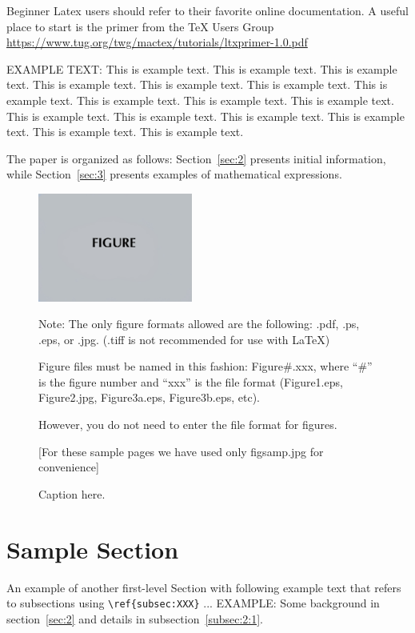 \documentclass[preprint]{JASA}
\begin{document}
  Beginner Latex users should refer to their favorite online
  documentation. A
  useful place to start is the primer from the TeX Users Group 
  \url{https://www.tug.org/twg/mactex/tutorials/ltxprimer-1.0.pdf}

EXAMPLE TEXT: This is example text. This is example text. This is
example text. This is example text. This is example text. This is
example text. This is example text. This is example text. This is
example text. This is example text. This is example text. This is
example text. This is example text. This is example text. This is
example text. This is example text. 

The paper is organized as follows: Section~\ref{sec:2} presents
initial information, while
Section~\ref{sec:3} presents examples of mathematical expressions.
\newpage


\begin{figure}[t]
\includegraphics[width=2in]{figsamp}
\caption{\label{fig:FIG1}{Caption here.}}

\raggedright
Note: The only figure formats allowed are the following: 
.pdf, .ps, .eps, or .jpg.  (.tiff is not recommended for use with LaTeX)

Figure files must be named in this fashion:
Figure\#.xxx, where ``\#'' is the figure number and ``xxx'' is the file format
(Figure1.eps, Figure2.jpg, Figure3a.eps, Figure3b.eps, etc). 

However, you do not need to enter the file format for figures.

[For these sample pages we have used only figsamp.jpg for convenience]
\end{figure}

\section{\label{sec:2} Sample Section}
An example of another first-level Section with following example text that refers to subsections using 
\verb+\ref{subsec:XXX}+ ...  EXAMPLE: Some background in
section~\ref{sec:2} and details  in subsection~\ref{subsec:2:1}. 
\end{document}
